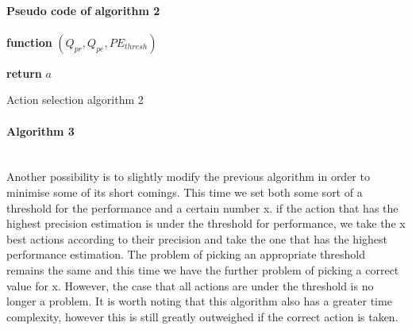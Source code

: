 \paragraph{Pseudo code of algorithm 2}
\begin{center}
	\begin{algorithm}

    \textbf{function}  $(Q_{pr},Q_{pe},PE_{thresh})$\;
    
    
    \Indp{}\Indm
    \Indp{} \Indm
    \Indp
    
   
  
   \textbf{return} $a$
   
    
\caption{Action selection algorithm 2}
\end{algorithm}
\end{center}
\paragraph{Algorithm 3}\mbox{}\\
Another possibility is to slightly modify the previous algorithm in order to minimise some of its short comings. This time we set both some sort of a threshold for the performance and a certain number x. if the action that has the highest precision estimation is under the threshold for performance, we take the x best actions according to their precision and take the one that has the highest performance estimation. The problem of picking an appropriate threshold remains the same and this time we have the further problem of picking a correct value for x. However, the case that all actions are under the threshold is no longer a problem. It is worth noting that this algorithm also has a greater time complexity, however this is still greatly outweighed if the correct action is taken.
